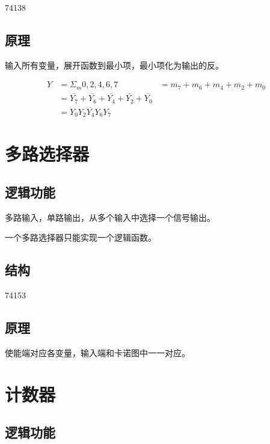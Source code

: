 74138

\subsection{原理}

输入所有变量，展开函数到最小项，最小项化为输出的反。

\begin{equation}
    \begin{aligned}
        Y & = \Sigma_m{0,2,4,6,7}
          & =m_7+m_6+m_4+m_2+m_0                                                         \\
          & = \overline{Y_7}+\overline{Y_6}+\overline{Y_4}+\overline{Y_2}+\overline{Y_0} \\
          & = \overline{Y_0Y_2Y_4Y_6Y_7}
    \end{aligned}
\end{equation}


\newpage

\section{多路选择器}

\subsection{逻辑功能}

多路输入，单路输出，从多个输入中选择一个信号输出。

一个多路选择器只能实现一个逻辑函数。

\subsection{结构}

74153

\subsection{原理}

使能端对应各变量，输入端和卡诺图中一一对应。


\newpage
\section{计数器}

\subsection{逻辑功能}

